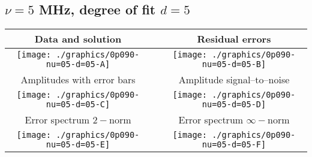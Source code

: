 

% 

\clearpage{}
\break{}

\subsection{$\nu = 5$ MHz, degree of fit $d = 5$}

\begin{table}[h]
    \begin{center}
        \begin{tabular}{ccc}
            Data and solution & \quad & Residual errors \\\hline
            \texttt{[image: ./graphics/0p090-nu=05-d=05-A]} &&
            \texttt{[image: ./graphics/0p090-nu=05-d=05-B]} \\[15pt]
            Amplitudes with error bars && Amplitude signal--to--noise \\\hline
            \texttt{[image: ./graphics/0p090-nu=05-d=05-C]} &&
            \texttt{[image: ./graphics/0p090-nu=05-d=05-D]} \\[15pt]
            Error spectrum $2-$norm && Error spectrum $\infty-$norm \\\hline
            \texttt{[image: ./graphics/0p090-nu=05-d=05-E]} &&
            \texttt{[image: ./graphics/0p090-nu=05-d=05-F]} \\[15pt]
        \end{tabular}
    \end{center}
\label{fig:elev=90, nu=5}
\end{table}



\endinput
